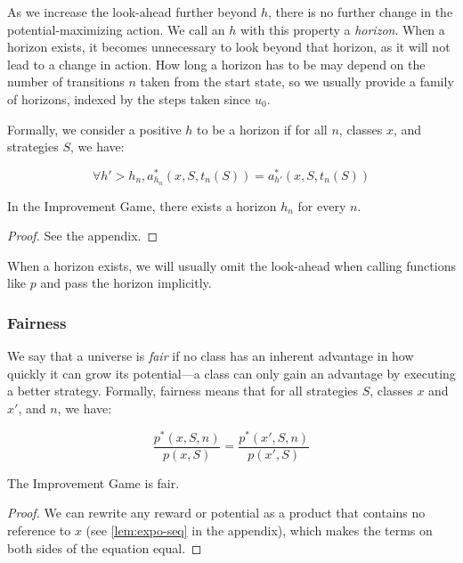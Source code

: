 As we increase the look-ahead further beyond $h$, there is no further change in
the potential-maximizing action. We call an $h$ with this property a
\emph{horizon}. When a horizon exists, it becomes unnecessary to look beyond
that horizon, as it will not lead to a change in action. How long a horizon has
to be may depend on the number of transitions $n$ taken from the start state, so
we usually provide a family of horizons, indexed by the steps taken since $u_0$.

Formally, we consider a positive $h$ to be a horizon if for all $n$, classes
$x$, and strategies $S$, we have:

\begin{equation}
  \forall h' > {h_n}, a^*_{h_n}(x,S,t_n(S)) = a^*_{h'}(x,S,t_n(S))
\end{equation}

\begin{theorem}
  \label{lem:horizon-exists}
  In the Improvement Game, there exists a horizon $h_n$ for every $n$.
\end{theorem}

\begin{proof}
  See the appendix.
\end{proof}

When a horizon exists, we will usually omit the look-ahead when calling
functions like $p$ and pass the horizon implicitly.

\subsubsection{Fairness}
\label{sec:fairness}

We say that a universe is \emph{fair} if no class has an inherent
advantage in how quickly it can grow its potential---a class can only gain an
advantage by executing a better strategy. Formally, fairness means that
for all strategies $S$, classes $x$ and $x'$, and $n$, we have:

\begin{equation}
  \frac{p^*(x,S,n)}{p(x,S)} =
  \frac{p^*(x',S,n)}{p(x',S)}
\end{equation}

\begin{theorem}
  \label{lem:fairness}
  The Improvement Game is fair.
\end{theorem}

\begin{proof}
  We can rewrite any reward or potential as a product that contains no reference
  to $x$ (see \cref{lem:expo-seq} in the appendix), which makes the terms on
  both sides of the equation equal.
\end{proof}

